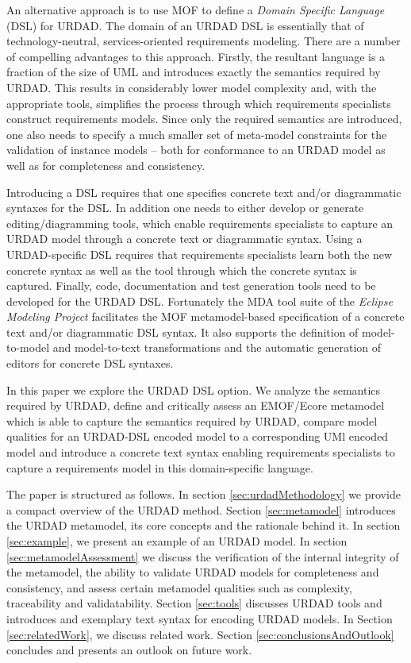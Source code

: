 An alternative approach is to use MOF to define a {\em Domain Specific Language} (DSL) for URDAD. The domain of an URDAD DSL is essentially that of technology-neutral, services-oriented requirements modeling. There are a number of compelling advantages to this approach. Firstly, the resultant language is a fraction of the size of UML and introduces exactly the semantics required by URDAD. This results in considerably lower model complexity and, with the appropriate tools, simplifies the process through which requirements specialists construct requirements models. Since only the required semantics are introduced, one also needs to specify a much smaller set of  meta-model constraints for the validation of instance models -- both for conformance to an URDAD model as well as for completeness and consistency.

Introducing a DSL requires that one specifies concrete text and/or diagrammatic syntaxes for the DSL. In addition one needs to either develop or generate editing/diagramming tools, which enable requirements specialists to capture an URDAD model through a concrete text or diagrammatic syntax. Using a URDAD-specific DSL requires that requirements specialists learn both the new concrete syntax as well as the tool through which the concrete syntax is captured. Finally, code, documentation and test generation tools need to be developed for the URDAD DSL. Fortunately the MDA tool suite of the {\em Eclipse Modeling Project} \cite{gronback_model_2008} facilitates the MOF metamodel-based specification of a concrete text and/or diagrammatic DSL syntax. It also supports the definition of model-to-model and model-to-text transformations and the automatic generation of editors for concrete DSL syntaxes.



In this paper we explore the URDAD DSL option. We analyze the semantics required by URDAD, define and critically assess an EMOF/Ecore metamodel which is able to capture the semantics required by URDAD, compare model qualities for an URDAD-DSL encoded model to a corresponding UMl encoded model and introduce a concrete text syntax enabling requirements specialists to capture a requirements model in this domain-specific language.

The paper is structured as follows. In section \ref{sec:urdadMethodology} we provide a compact overview of the URDAD method. Section \ref{sec:metamodel} introduces the URDAD metamodel, its core concepts and the rationale behind it. In section \ref{sec:example}, we present an example of an URDAD model. In section \ref{sec:metamodelAssessment} we discuss the verification of the internal integrity of the metamodel, the ability to validate URDAD models for completeness and consistency, and assess certain metamodel qualities such as complexity, traceability and validatability. Section \ref{sec:tools} discusses URDAD tools and introduces and exemplary text syntax for encoding URDAD models. In Section \ref{sec:relatedWork}, we discuss related work. Section \ref{sec:conclusionsAndOutlook} concludes and presents an outlook on future work.


